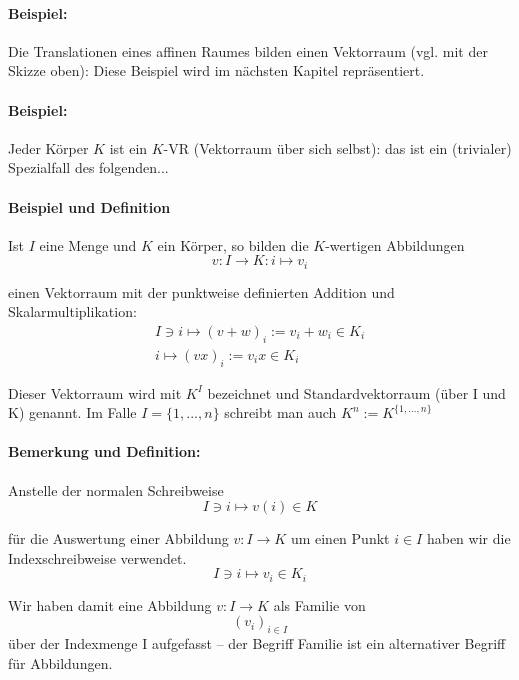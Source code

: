 \documentclass[12pt,a4paper,parskip=half-,DIV=15]{scrreprt}
\begin{document}
\paragraph{Beispiel:} Die Translationen eines affinen Raumes bilden einen Vektorraum (vgl. mit der Skizze oben): Diese Beispiel wird im nächsten Kapitel repräsentiert.
\paragraph{Beispiel:} Jeder Körper $ K $ ist ein $ K $-VR (Vektorraum über sich selbst): das ist ein (trivialer) Spezialfall des folgenden...
\paragraph{Beispiel und Definition} Ist $ I $ eine Menge und $ K $ ein Körper, so bilden die $ K $-wertigen Abbildungen
\begin{equation*}
v: I \to K: i \mapsto v_i
\end{equation*}

einen Vektorraum mit der punktweise definierten Addition und Skalarmultiplikation:
\begin{gather*}
I\ni i \mapsto (v+w)_i := v_i+w_i\in K_i\\
i \mapsto (vx)_i := v_ix \in K_i
\end{gather*}

Dieser Vektorraum wird mit $K^{I}$ bezeichnet und Standardvektorraum (über I und K) genannt. Im Falle $ I=\{1,...,n\} $ schreibt man auch $K^{n} := K^{\{1,...,n\}}$

\paragraph{Bemerkung und Definition:} Anstelle der normalen Schreibweise
\begin{equation*}
I\ni i \mapsto v(i) \in K
\end{equation*}

für die Auswertung einer Abbildung  $v: I \to K$ um einen Punkt $i\in I$ haben wir die Indexschreibweise verwendet.
\begin{equation*}
I\ni i \mapsto v_i \in K_i
\end{equation*}

Wir haben damit eine Abbildung $v: I \to K$ als Familie von
\begin{equation*}
(v_i)_{i\in I}
\end{equation*}
über der Indexmenge I aufgefasst -- der Begriff Familie ist ein \glqq alternativer\grqq{} Begriff für Abbildungen.
\end{document}
